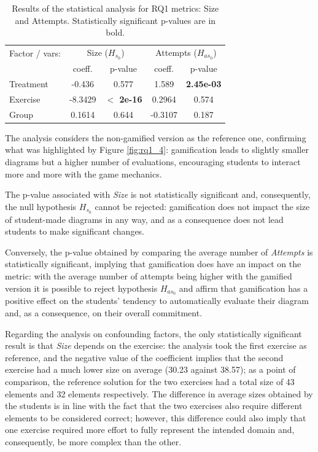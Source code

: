 \begin{table}[ht]
\footnotesize
\centering
\begin{tabular}{lcccc}
    \toprule
         Factor / vars:& 
         \multicolumn{2}{c}{Size (${H_{s_{0}}}$)} & \multicolumn{2}{c}{Attempts (${H_{as_{0}}}$)} \\
         & coeff. & p-value & coeff. & p-value \\
    \midrule
    Treatment & -0.436 & 0.577 & 1.589 & \textbf{2.45e-03} \\
    Exercise & -8.3429 & \textbf{$\lt$ 2e-16} & 0.2964 & 0.574 \\
    Group & 0.1614 & 0.644 & -0.3107 & 0.187 \\
    \bottomrule
    \end{tabular}
\caption{Results of the statistical analysis for RQ1 metrics: Size and Attempts. Statistically significant p-values are in bold.}
\label{tab:rq1_4_anova}
\end{table}


The analysis considers the non-gamified version as the reference one, confirming what was highlighted by Figure \ref{fig:rq1_4}: gamification leads to slightly smaller diagrams but a higher number of evaluations, encouraging students to interact more and more with the game mechanics.

The p-value associated with \textit{Size} is not statistically significant and, consequently, the null hypothesis ${H_{s_{0}}}$ cannot be rejected: gamification does not impact the size of student-made diagrams in any way, and as a consequence does not lead students to make significant changes.

Conversely, the p-value obtained by comparing the average number of \textit{Attempts} is statistically significant, implying that gamification does have an impact on the metric: with the average number of attempts being higher with the gamified version it is possible to reject hypothesis ${H_{as_{0}}}$ and affirm that gamification has a positive effect on the students' tendency to automatically evaluate their diagram and, as a consequence, on their overall commitment.

Regarding the analysis on confounding factors, the only statistically significant result is that \textit{Size} depends on the exercise: the analysis took the first exercise as reference, and the negative value of the coefficient implies that the second exercise had a much lower size on average (30.23 against 38.57); as a point of comparison, the reference solution for the two exercises had a total size of 43 elements and 32 elements respectively. The difference in average sizes obtained by the students is in line with the fact that the two exercises also require different elements to be considered correct; however, this difference could also imply that one exercise required more effort to fully represent the intended domain and, consequently, be more complex than the other.


